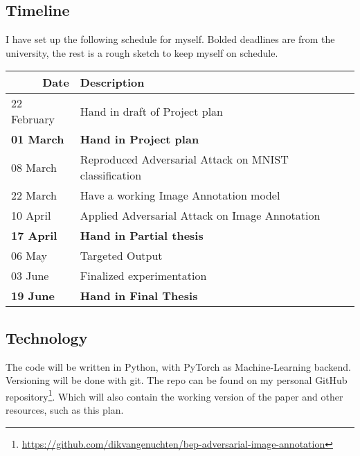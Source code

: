 \documentclass[12pt]{extarticle}
\begin{document}
\subsection{Timeline}
I have set up the following schedule for myself. Bolded deadlines are from the university, the rest is a rough sketch to keep myself on schedule.

\begin{table}[h]
    \begin{tabular}{|l|l|}
        \hline
        \multicolumn{1}{|r|}{Date} & Description                                           \\ \hline
        22 February                & Hand in draft of Project plan                         \\ \hline
        \textbf{01 March}          & \textbf{Hand in Project plan}                         \\ \hline
        08 March                   & Reproduced Adversarial Attack on MNIST classification \\ \hline
        22 March                   & Have a working Image Annotation model                 \\ \hline
        10 April                   & Applied Adversarial Attack on Image Annotation        \\ \hline
        \textbf{17 April}          & \textbf{Hand in Partial thesis}                       \\ \hline
        06 May                     & Targeted Output                                       \\ \hline
        03 June                    & Finalized experimentation                             \\ \hline
        \textbf{19 June}           & \textbf{Hand in Final Thesis}                         \\ \hline
    \end{tabular}
\end{table}


\subsection{Technology}
The code will be written in Python, with PyTorch as Machine-Learning backend.
Versioning will be done with git.
The repo can be found on my personal GitHub repository\footnote{\url{https://github.com/dikvangenuchten/bep-adversarial-image-annotation}}. Which will also contain the working version of the paper and other resources, such as this plan.




\end{document}
